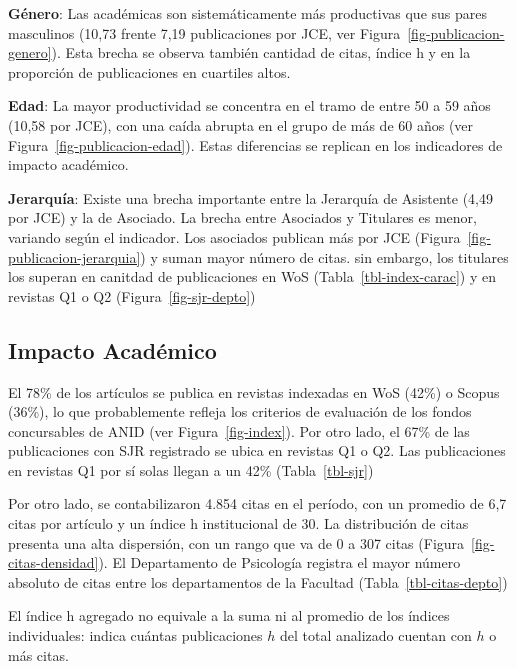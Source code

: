 \documentclass[
  a4paper,
  oneside]{scrbook}
\begin{document}
\textbf{Género}: Las académicas son sistemáticamente más productivas que
sus pares masculinos (10,73 frente 7,19 publicaciones por JCE, ver
Figura~\ref{fig-publicacion-genero}). Esta brecha se observa también
cantidad de citas, índice h y en la proporción de publicaciones en
cuartiles altos.

\textbf{Edad}: La mayor productividad se concentra en el tramo de entre
50 a 59 años (10,58 por JCE), con una caída abrupta en el grupo de más
de 60 años (ver Figura~\ref{fig-publicacion-edad}). Estas diferencias se
replican en los indicadores de impacto académico.

\textbf{Jerarquía}: Existe una brecha importante entre la Jerarquía de
Asistente (4,49 por JCE) y la de Asociado. La brecha entre Asociados y
Titulares es menor, variando según el indicador. Los asociados publican
más por JCE (Figura~\ref{fig-publicacion-jerarquia}) y suman mayor
número de citas. sin embargo, los titulares los superan en canitdad de
publicaciones en WoS (Tabla~\ref{tbl-index-carac}) y en revistas Q1 o Q2
(Figura~\ref{fig-sjr-depto})

\subsection*{Impacto Académico}\label{impacto-acaduxe9mico}

El 78\% de los artículos se publica en revistas indexadas en WoS (42\%)
o Scopus (36\%), lo que probablemente refleja los criterios de
evaluación de los fondos concursables de ANID (ver
Figura~\ref{fig-index}). Por otro lado, el 67\% de las publicaciones con
SJR registrado se ubica en revistas Q1 o Q2. Las publicaciones en
revistas Q1 por sí solas llegan a un 42\% (Tabla~\ref{tbl-sjr})

Por otro lado, se contabilizaron 4.854 citas en el período, con un
promedio de 6,7 citas por artículo y un índice h institucional de 30. La
distribución de citas presenta una alta dispersión, con un rango que va
de 0 a 307 citas (Figura~\ref{fig-citas-densidad}). El Departamento de
Psicología registra el mayor número absoluto de citas entre los
departamentos de la Facultad (Tabla~\ref{tbl-citas-depto})

\begin{tcolorbox}[enhanced jigsaw, breakable, opacityback=0, colback=white, toprule=.15mm, arc=.35mm, bottomrule=.15mm, rightrule=.15mm, leftrule=.75mm, colframe=quarto-callout-note-color-frame, left=2mm]
\begin{minipage}[t]{5.5mm}
\textcolor{quarto-callout-note-color}{\faInfo}
\end{minipage}%
\begin{minipage}[t]{\textwidth - 5.5mm}

El índice h agregado no equivale a la suma ni al promedio de los índices
individuales: indica cuántas publicaciones \(h\) del total analizado
cuentan con \(h\) o más citas.

\end{minipage}%
\end{tcolorbox}
\end{document}

